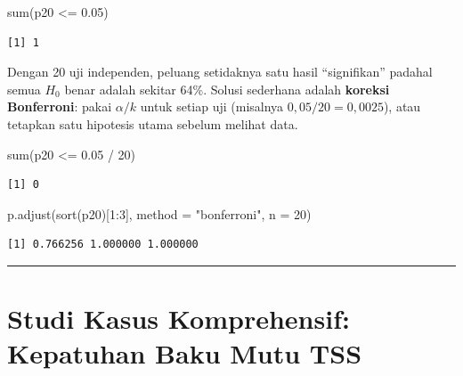 \documentclass[
  indonesian,
  letterpaper,
]{book}
\newenvironment{Shaded}{\begin{snugshade}}{\end{snugshade}}
\newcommand{\AttributeTok}[1]{\textcolor[rgb]{0.40,0.45,0.13}{#1}}
\newcommand{\DecValTok}[1]{\textcolor[rgb]{0.68,0.00,0.00}{#1}}
\newcommand{\FloatTok}[1]{\textcolor[rgb]{0.68,0.00,0.00}{#1}}
\newcommand{\FunctionTok}[1]{\textcolor[rgb]{0.28,0.35,0.67}{#1}}
\newcommand{\NormalTok}[1]{\textcolor[rgb]{0.00,0.23,0.31}{#1}}
\newcommand{\SpecialCharTok}[1]{\textcolor[rgb]{0.37,0.37,0.37}{#1}}
\newcommand{\StringTok}[1]{\textcolor[rgb]{0.13,0.47,0.30}{#1}}
\begin{document}
\begin{Shaded}
\begin{Highlighting}[]
\FunctionTok{sum}\NormalTok{(p20 }\SpecialCharTok{\textless{}=} \FloatTok{0.05}\NormalTok{)}
\end{Highlighting}
\end{Shaded}

\begin{verbatim}
[1] 1
\end{verbatim}

Dengan 20 uji independen, peluang setidaknya satu hasil ``signifikan''
padahal semua \(H_0\) benar adalah sekitar 64\%. Solusi sederhana adalah
\textbf{koreksi Bonferroni}: pakai \(\alpha/k\) untuk setiap uji
(misalnya \(0{,}05/20 = 0{,}0025\)), atau tetapkan satu hipotesis utama
sebelum melihat data.

\begin{Shaded}
\begin{Highlighting}[]
\FunctionTok{sum}\NormalTok{(p20 }\SpecialCharTok{\textless{}=} \FloatTok{0.05} \SpecialCharTok{/} \DecValTok{20}\NormalTok{)}
\end{Highlighting}
\end{Shaded}

\begin{verbatim}
[1] 0
\end{verbatim}

\begin{Shaded}
\begin{Highlighting}[]
\FunctionTok{p.adjust}\NormalTok{(}\FunctionTok{sort}\NormalTok{(p20)[}\DecValTok{1}\SpecialCharTok{:}\DecValTok{3}\NormalTok{], }\AttributeTok{method =} \StringTok{"bonferroni"}\NormalTok{, }\AttributeTok{n =} \DecValTok{20}\NormalTok{)}
\end{Highlighting}
\end{Shaded}

\begin{verbatim}
[1] 0.766256 1.000000 1.000000
\end{verbatim}

\begin{center}\rule{0.5\linewidth}{0.5pt}\end{center}


\chapter{Studi Kasus Komprehensif: Kepatuhan Baku Mutu
TSS}\label{studi-kasus-komprehensif-kepatuhan-baku-mutu-tss}
\end{document}
